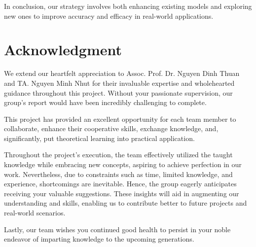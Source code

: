 \documentclass{ieeeojies}
\begin{document}
In conclusion, our strategy involves both enhancing existing models and exploring new ones to improve accuracy and efficacy in real-world applications.

\section*{Acknowledgment}
\hspace{1em}We extend our heartfelt appreciation to Assoc. Prof. Dr. Nguyen Dinh Thuan and TA. Nguyen Minh Nhut for their invaluable expertise and wholehearted guidance throughout this project. Without your passionate supervision, our group's report would have been incredibly challenging to complete.

This project has provided an excellent opportunity for each team member to collaborate, enhance their cooperative skills, exchange knowledge, and, significantly, put theoretical learning into practical application.

Throughout the project's execution, the team effectively utilized the taught knowledge while embracing new concepts, aspiring to achieve perfection in our work. Nevertheless, due to constraints such as time, limited knowledge, and experience, shortcomings are inevitable. Hence, the group eagerly anticipates receiving your valuable suggestions. These insights will aid in augmenting our understanding and skills, enabling us to contribute better to future projects and real-world scenarios.

Lastly, our team wishes you continued good health to persist in your noble endeavor of imparting knowledge to the upcoming generations.



\EOD
\end{document}
